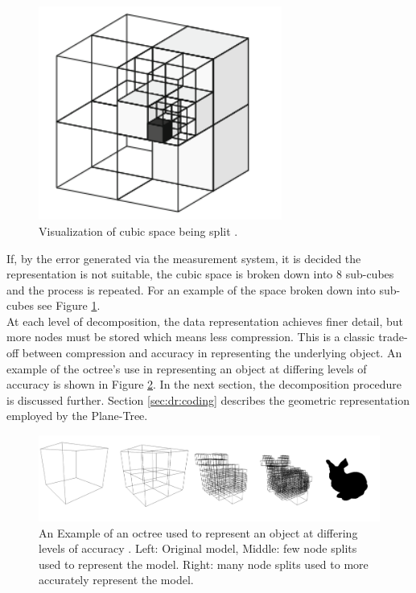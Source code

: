 \begin{figure}[!htb]
\centering
\includegraphics[width=8cm]{images/methodology/pt/octreeVis}
\caption{Visualization of cubic space being split \cite{Hornung13Octomap}.}
\label{fig:SpaceVis}
\end{figure}

If, by the error generated via the measurement system, it is decided the representation is not suitable, the cubic space is broken down into 8 sub-cubes and the process is repeated. For an example of the space broken down into sub-cubes see Figure \ref{fig:SpaceVis}. \\

At each level of decomposition, the data representation achieves finer detail, but more nodes must be stored which means less compression. This is a classic trade-off between compression and accuracy in representing the underlying object. An example of the octree's use in representing an object at differing levels of accuracy is shown in Figure \ref{fig:octreeaccuracy}. In the next section, the decomposition procedure is discussed further. Section \ref{sec:dr:coding} describes the geometric representation employed by the Plane-Tree.


\begin{figure}[!htb]
\centering
\includegraphics[width=14cm]{images/ch2/OctreeExample}
\caption{An Example of an octree used to represent an object at differing levels of accuracy \cite{Hornung13Octomap}. Left: Original model, Middle: few node splits used to represent the model. Right: many node splits used to more accurately represent the model.}
\label{fig:octreeaccuracy}
\end{figure}


